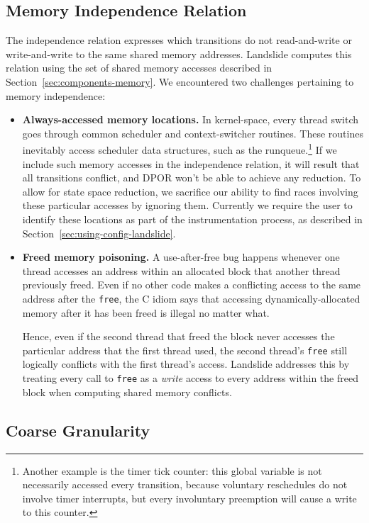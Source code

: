 \subsection{Memory Independence Relation}
\label{sec:por-independence}
The independence relation expresses which transitions do not read-and-write or write-and-write to the same shared memory addresses. Landslide computes this relation using the set of shared memory accesses described in Section~\ref{sec:components-memory}. We encountered two challenges pertaining to memory independence:

\begin{itemize}
	\item {\bf Always-accessed memory locations.}
		In kernel-space, every thread switch goes through common scheduler and context-switcher routines. These routines inevitably access scheduler data structures, such as the runqueue.\footnote{
		Another example is the timer tick counter: this global variable is not necessarily accessed every transition, because voluntary reschedules do not involve timer interrupts, but every involuntary preemption will cause a write to this counter.}
		If we include such memory accesses in the independence relation, it will result that all transitions conflict, and DPOR won't be able to achieve any reduction. To allow for state space reduction, we sacrifice our ability to find races involving these particular accesses by ignoring them. Currently we require the user to identify these locations as part of the instrumentation process, as described in Section~\ref{sec:using-config-landslide}.
	\item {\bf Freed memory poisoning.}
		A use-after-free bug happens whenever one thread accesses an address within an allocated block that another thread previously freed. Even if no other code makes a conflicting access to the same address after the \texttt{free}, the C idiom says that accessing dynamically-allocated memory after it has been freed is illegal no matter what.

		Hence, even if the second thread that freed the block never accesses the particular address that the first thread used, the second thread's \texttt{free} still logically conflicts with the first thread's access. Landslide addresses this by treating every call to \texttt{free} as a {\em write} access to every address within the freed block when computing shared memory conflicts.
\end{itemize}

\subsection{Coarse Granularity}

